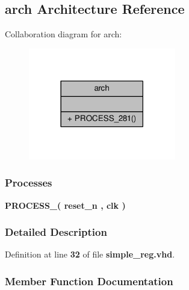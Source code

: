 \subsection{arch Architecture Reference}
\label{classsimple__reg_1_1arch}


Collaboration diagram for arch\+:\nopagebreak
\begin{figure}[H]
\begin{center}
\leavevmode
\includegraphics[width=182pt]{d4/d5d/classsimple__reg_1_1arch__coll__graph}
\end{center}
\end{figure}
\subsubsection*{Processes}
 \begin{DoxyCompactItemize}
\item 
{\bf P\+R\+O\+C\+E\+S\+S\+\_}{\bfseries  ( {\bfseries {\bfseries {\bf reset\+\_\+n}} \textcolor{vhdlchar}{ }} , {\bfseries {\bfseries {\bf clk}} \textcolor{vhdlchar}{ }} )}
\end{DoxyCompactItemize}


\subsubsection{Detailed Description}


Definition at line {\bf 32} of file {\bf simple\+\_\+reg.\+vhd}.



\subsubsection{Member Function Documentation}
